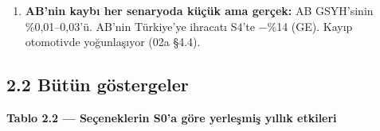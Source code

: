 \begin{enumerate}
  \begin{itemize}
  \tightlist
  \item
    İhtiyatlı tahmin S4'e yakın: −\%18. Bu tahmin AB katılımının kendi etkisiyle karışıyor; kayıp için üst sınır.
  \item
    İyimser tahmin sıfır. Türkiye--BK STA'sı (2021) sıfır tarifeyi korudu ve menşede AB girdisiyle kümülasyona izin verdi. GB'den STA'ya geçişte ticaret kaybı istatistiksel olarak sıfır çıktı. Yalnızca tek çift ve üç yıl var.
  \item
    Ders: \textbf{menşe tasarımı (PEM, çapraz kümülasyon, tolerans) S3'ü S0'a yaklaştırır; kötü tasarım S4'e yaklaştırır.}
  \end{itemize}
\item
  \textbf{AB'nin kaybı her senaryoda küçük ama gerçek:} AB GSYH'sinin \%0,01--0,03'ü. AB'nin Türkiye'ye ihracatı S4'te −\%14 (GE). Kayıp otomotivde yoğunlaşıyor (02a §4.4).
\end{enumerate}

\hypertarget{02b_secenekler_hukuk-22-buxfctuxfcn-guxf6stergeler}{%
\subsection{2.2 Bütün göstergeler}\label{02b_secenekler_hukuk-22-buxfctuxfcn-guxf6stergeler}}


\textbf{Tablo 2.2 --- Seçeneklerin S0'a göre yerleşmiş yıllık etkileri}

\nopagebreak[4]

\begingroup\gbtablo\footnotesize

